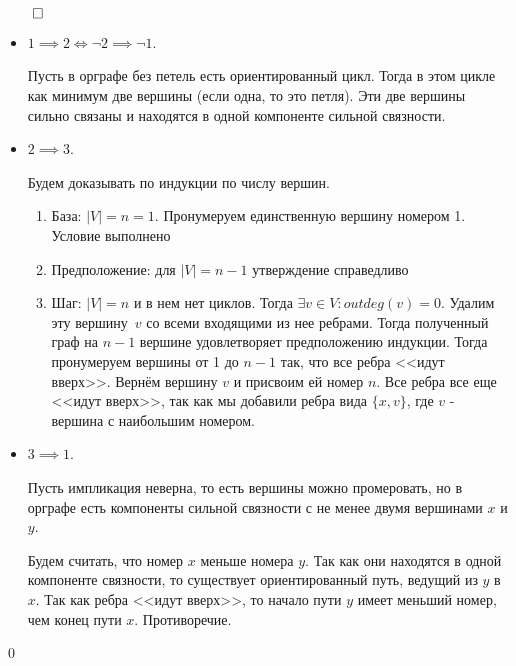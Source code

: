 \documentclass[a4paper,12pt,leqno]{article}
\theoremstyle{plain} %
\theoremstyle{definition} %
\renewenvironment{proof}{$\qed$}{{\qed}} %
\begin{document}
\begin{proof}

\begin{itemize}
    \item $1 \implies 2 \iff \neg 2 \implies \neg 1$.
    
    Пусть в орграфе без петель есть ориентированный цикл. Тогда в этом цикле как минимум две вершины (если одна, то это петля). Эти две вершины сильно связаны и находятся в одной компоненте сильной связности.
    
    \item $2 \implies 3$.
    
    Будем доказывать по индукции по числу вершин.
    
    \begin{enumerate}
        \item База: $|V| = n = 1$. Пронумеруем единственную вершину номером 1. Условие выполнено
        
        \item Предположение: для $|V| = n - 1$ утверждение справедливо
        
        \item Шаг: $|V| = n$ и в нем нет циклов. Тогда $\exists v \in V: outdeg(v) = 0$. Удалим эту вершину~$v$ со всеми входящими из нее ребрами. Тогда полученный граф на $n - 1$ вершине удовлетворяет предположению индукции. Тогда пронумеруем вершины от 1 до $n - 1$ так, что все ребра <<идут вверх>>. Вернём вершину $v$ и присвоим ей номер $n$. Все ребра все еще <<идут вверх>>, так как мы добавили ребра вида $\{x, v\}$, где $v$ - вершина с наибольшим номером.
        
    \end{enumerate}
    
    \item $3 \implies 1$.
    
    Пусть импликация неверна, то есть вершины можно промеровать, но в орграфе есть компоненты сильной связности с не менее двумя вершинами $x$ и $y$.
    
    Будем считать, что номер $x$ меньше номера $y$. Так как они находятся в одной компоненте связности, то существует ориентированный путь, ведущий из $y$ в $x$. Так как ребра  <<идут вверх>>, то начало пути $y$ имеет меньший номер, чем конец пути $x$. Противоречие. 
\end{itemize}

\end{proof}
\end{document}
